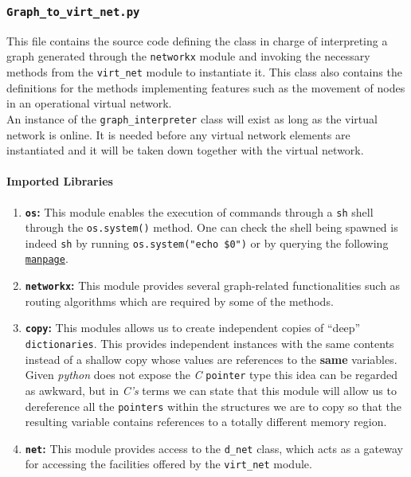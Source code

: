 \subsubsection{\texttt{Graph\_to\_virt\_net.py}}
   This file contains the source code defining the class in charge of interpreting a graph generated through the \texttt{networkx} module and invoking the necessary methods from the \texttt{virt\_net} module to instantiate it. This class also contains the definitions for the methods implementing features such as the movement of nodes in an operational virtual network.\\

   An instance of the \texttt{graph\_interpreter} class will exist as long as the virtual network is online. It is needed before any virtual network elements are instantiated and it will be taken down together with the virtual network.\\

   \paragraph{Imported Libraries}
        \begin{enumerate}
            \item \textbf{\texttt{os}:} This module enables the execution of commands through a \texttt{sh} shell through the \texttt{os.system()} method. One can check the shell being spawned is indeed \texttt{sh} by running \texttt{\allowbreak os.system("echo \$0")} or by querying the following \href{https://linux.die.net/man/3/system}{\texttt{manpage}}.
            \item \textbf{\texttt{networkx}:} This module provides several graph-related functionalities such as routing algorithms which are required by some of the methods.
            \item \textbf{\texttt{copy}:} This modules allows us to create independent copies of ``deep'' \texttt{dictionaries}. This provides independent instances with the same contents instead of a shallow copy whose values are references to the \textbf{same} variables. Given \textit{python} does not expose the \textit{C} \texttt{pointer} type this idea can be regarded as awkward, but in \textit{C's} terms we can state that this module will allow us to dereference all the \texttt{pointers} within the structures we are to copy so that the resulting variable contains references to a totally different memory region.
            \item \textbf{\texttt{net}:} This module provides access to the \texttt{d\_net} class, which acts as a gateway for accessing the facilities offered by the \texttt{virt\_net} module.
        \end{enumerate}

